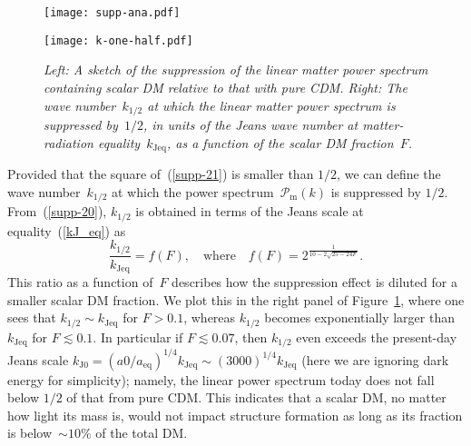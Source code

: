 \documentclass[11pt,nofootinbib]{article}
\numberwithin{equation}{section}
\begin{document}
\begin{figure}[t]
 \begin{minipage}{.53\linewidth}
  \begin{center}
 \texttt{[image: supp-ana.pdf]}
  \end{center}
 \end{minipage} 
 \begin{minipage}{0.01\linewidth} 
  \begin{center}
  \end{center}
 \end{minipage} 
 \begin{minipage}{.40\linewidth}
  \begin{center}
 \texttt{[image: k-one-half.pdf]}
  \end{center}
 \end{minipage} 
 \caption{\emph{Left: A sketch of the suppression of the linear matter power
 spectrum containing scalar DM relative to that with pure CDM.
 Right: The wave number~$k_{1/2}$ at which the linear matter
 power spectrum is suppressed by~$1/2$, in units of the Jeans wave number at
 matter-radiation equality~$k_{\mathrm{Jeq}}$, as a function of the
 scalar DM fraction~$F$.}}
 \label{fig:supp-ana}
\end{figure}


Provided that the square of~(\ref{supp-21}) is smaller than $1/2$, we
can define the wave 
number~$k_{1/2}$ at which the power spectrum~$\mathcal{P}_{\mathrm{m}} (k) $
is suppressed by $1/2$.
From~(\ref{supp-20}), $k_{1/2}$ is obtained
in terms of the Jeans scale at equality~(\ref{kJ_eq}) as
\begin{equation}
 \frac{k_{1/2}}{k_{\mathrm{Jeq}}} = f(F),
  \quad
  \mathrm{where}
  \quad
  f(F) = 2^{\frac{1}{10- 2\sqrt{25-24 F }}}.
  \label{k0.5analytic}
\end{equation}
This ratio as a function of~$F$ describes how the suppression effect
is diluted for a smaller scalar DM fraction.
We plot this in the right panel of
Figure~\ref{fig:supp-ana}, where one sees that 
$k_{1/2} \sim  k_{\mathrm{Jeq}}$ for $F > 0.1$,
whereas $k_{1/2} $ becomes exponentially larger than $ k_{\mathrm{Jeq}}$
for $F \lesssim 0.1$.
In particular if $F \lesssim 0.07$, 
then $k_{1/2}$ even exceeds the present-day Jeans scale
$k_{\mathrm{J}0} = (a0/a_{\mathrm{eq}})^{1/4} k_{\mathrm{Jeq}} \sim
(3000)^{1/4} k_{\mathrm{Jeq}}$
(here we are ignoring dark energy for simplicity);
namely, the linear power spectrum today does not fall below $1/2$ of
that from pure CDM.
This indicates that a scalar DM, no matter how light its mass is,
would not impact structure formation
as long as its fraction is below~$\sim 10\%$ of the total DM.
\end{document}
